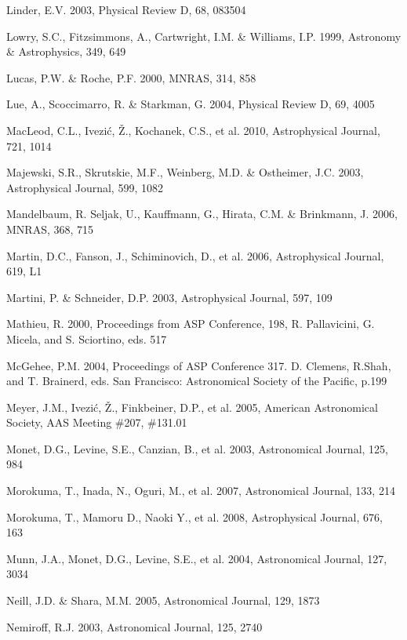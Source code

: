 \documentclass{emulateapj}
\begin{document}
\begin{thebibliography}{}
\bibitem[()]{} Linder, E.V. 2003, Physical Review D, 68, 083504
	
\bibitem[()]{} Lowry, S.C., Fitzsimmons, A., Cartwright, I.M. \& Williams, I.P. 1999, Astronomy \& 
             Astrophysics, 349, 649

\bibitem[()]{} Lucas, P.W. \& Roche, P.F. 2000, MNRAS, 314, 858
	
\bibitem[()]{} Lue, A., Scoccimarro, R. \& Starkman, G. 2004, Physical Review D, 69, 4005

\bibitem[()]{} MacLeod, C.L., Ivezi\'{c}, \v{Z}., Kochanek, C.S., et al. 2010, Astrophysical Journal, 721, 1014

\bibitem[()]{} Majewski, S.R., Skrutskie, M.F., Weinberg, M.D. \& Ostheimer, J.C. 2003, 
             Astrophysical Journal, 599, 1082

\bibitem[()]{} Mandelbaum, R. Seljak, U., Kauffmann, G., Hirata, C.M. \& Brinkmann, J. 2006, MNRAS, 368, 715

\bibitem[()]{} Martin, D.C., Fanson, J., Schiminovich, D., et al. 2006, Astrophysical Journal, 619, L1

\bibitem[()]{} Martini, P. \& Schneider, D.P. 2003, Astrophysical Journal, 597, 109

\bibitem[()]{} Mathieu, R. 2000, Proceedings from ASP Conference, 198, R. Pallavicini, G. Micela, and 
             S. Sciortino, eds. 517

\bibitem[()]{} McGehee, P.M. 2004, Proceedings of ASP Conference 317. D. Clemens, R.Shah, and T. Brainerd, 
                    eds. San Francisco: Astronomical Society of the Pacific, p.199

\bibitem[()]{} Meyer, J.M., Ivezi\'{c}, \v{Z}., Finkbeiner, D.P., et al. 2005, American Astronomical 
             Society, AAS Meeting \#207, \#131.01

\bibitem[()]{} Monet, D.G., Levine, S.E., Canzian, B., et al. 2003, Astronomical Journal, 125, 984

\bibitem[()]{} Morokuma, T., Inada, N., Oguri, M., et al. 2007, Astronomical Journal, 133, 214

\bibitem[()]{} Morokuma, T., Mamoru D., Naoki Y., et al. 2008, Astrophysical Journal, 676, 163	

\bibitem[()]{} Munn, J.A., Monet, D.G., Levine, S.E., et al. 2004, Astronomical Journal, 127, 3034
	
\bibitem[()]{} Neill, J.D. \& Shara, M.M. 2005, Astronomical Journal, 129, 1873

\bibitem[()]{} Nemiroff, R.J. 2003, Astronomical Journal, 125, 2740


\end{thebibliography}
\end{document}
